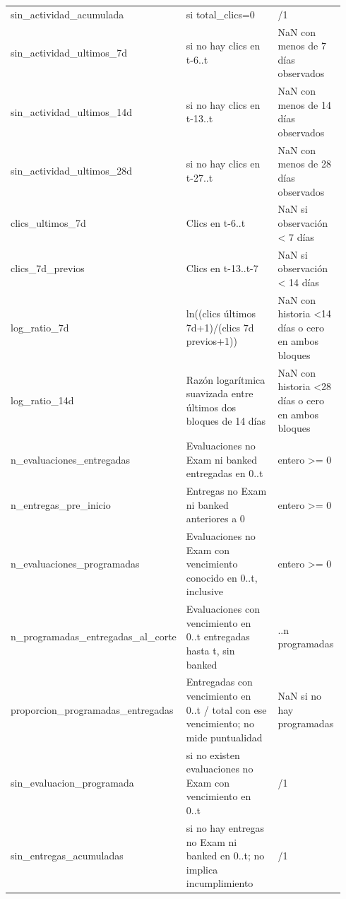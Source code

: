 \begin{longtable}{>{\raggedright\arraybackslash}p{0.29\linewidth}>{\raggedright\arraybackslash}p{0.43\linewidth}>{\raggedright\arraybackslash}p{0.22\linewidth}}
sin\_\allowbreak{}actividad\_\allowbreak{}acumulada & 1 si total\_\allowbreak{}clics=0 & 0/1 \\
sin\_\allowbreak{}actividad\_\allowbreak{}ultimos\_\allowbreak{}7d & 1 si no hay clics en t-6..t & NaN con menos de 7 días observados \\
sin\_\allowbreak{}actividad\_\allowbreak{}ultimos\_\allowbreak{}14d & 1 si no hay clics en t-13..t & NaN con menos de 14 días observados \\
sin\_\allowbreak{}actividad\_\allowbreak{}ultimos\_\allowbreak{}28d & 1 si no hay clics en t-27..t & NaN con menos de 28 días observados \\
clics\_\allowbreak{}ultimos\_\allowbreak{}7d & Clics en t-6..t & NaN si observación < 7 días \\
clics\_\allowbreak{}7d\_\allowbreak{}previos & Clics en t-13..t-7 & NaN si observación < 14 días \\
log\_\allowbreak{}ratio\_\allowbreak{}7d & ln((clics últimos 7d+1)/(clics 7d previos+1)) & NaN con historia <14 días o cero en ambos bloques \\
log\_\allowbreak{}ratio\_\allowbreak{}14d & Razón logarítmica suavizada entre últimos dos bloques de 14 días & NaN con historia <28 días o cero en ambos bloques \\
n\_\allowbreak{}evaluaciones\_\allowbreak{}entregadas & Evaluaciones no Exam ni banked entregadas en 0..t & entero >= 0 \\
n\_\allowbreak{}entregas\_\allowbreak{}pre\_\allowbreak{}inicio & Entregas no Exam ni banked anteriores a 0 & entero >= 0 \\
n\_\allowbreak{}evaluaciones\_\allowbreak{}programadas & Evaluaciones no Exam con vencimiento conocido en 0..t, inclusive & entero >= 0 \\
n\_\allowbreak{}programadas\_\allowbreak{}entregadas\_\allowbreak{}al\_\allowbreak{}corte & Evaluaciones con vencimiento en 0..t entregadas hasta t, sin banked & 0..n programadas \\
proporcion\_\allowbreak{}programadas\_\allowbreak{}entregadas & Entregadas con vencimiento en 0..t / total con ese vencimiento; no mide puntualidad & NaN si no hay programadas \\
sin\_\allowbreak{}evaluacion\_\allowbreak{}programada & 1 si no existen evaluaciones no Exam con vencimiento en 0..t & 0/1 \\
sin\_\allowbreak{}entregas\_\allowbreak{}acumuladas & 1 si no hay entregas no Exam ni banked en 0..t; no implica incumplimiento & 0/1 \\
\end{longtable}\endgroup

